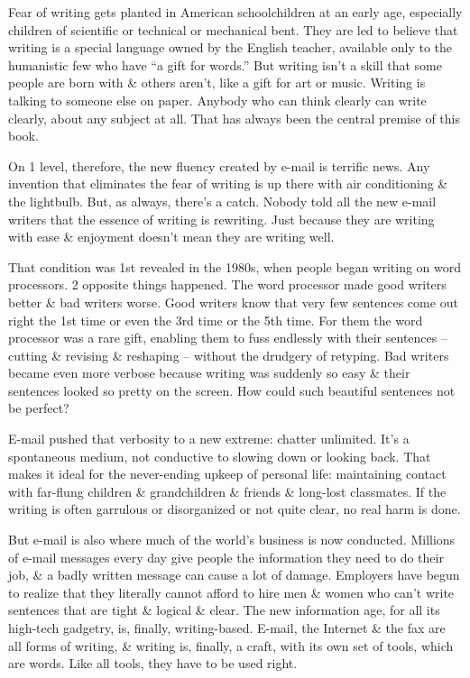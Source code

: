 \documentclass{article}
\begin{document}
Fear of writing gets planted in American schoolchildren at an early age, especially children of scientific or technical or mechanical bent. They are led to believe that writing is a special language owned by the English teacher, available only to the humanistic few who have ``a gift for words.'' But writing isn't a skill that some people are born with \& others aren't, like a gift for art or music. Writing is talking to someone else on paper. Anybody who can think clearly can write clearly, about any subject at all. That has always been the central premise of this book.

On 1 level, therefore, the new fluency created by e-mail is terrific news. Any invention that eliminates the fear of writing is up there with air conditioning \& the lightbulb. But, as always, there's a catch. Nobody told all the new e-mail writers that the essence of writing is rewriting. Just because they are writing with ease \& enjoyment doesn't mean they are writing well.

That condition was 1st revealed in the 1980s, when people began writing on word processors. 2 opposite things happened. The word processor made good writers better \& bad writers worse. Good writers know that very few sentences come out right the 1st time or even the 3rd time or the 5th time. For them the word processor was a rare gift, enabling them to fuss endlessly with their sentences -- cutting \& revising \& reshaping -- without the drudgery of retyping. Bad writers became even more verbose because writing was suddenly so easy \& their sentences looked so pretty on the screen. How could such beautiful sentences not be perfect?

E-mail pushed that verbosity to a new extreme: chatter unlimited. It's a spontaneous medium, not conductive to slowing down or looking back. That makes it ideal for the never-ending upkeep of personal life: maintaining contact with far-flung children \& grandchildren \& friends \& long-lost classmates. If the writing is often garrulous or disorganized or not quite clear, no real harm is done.

But e-mail is also where much of the world's business is now conducted. Millions of e-mail messages every day give people the information they need to do their job, \& a badly written message can cause a lot of damage. Employers have begun to realize that they literally cannot afford to hire men \& women who can't write sentences that are tight \& logical \& clear. The new information age, for all its high-tech gadgetry, is, finally, writing-based. E-mail, the Internet \& the fax are all forms of writing, \& writing is, finally, a craft, with its own set of tools, which are words. Like all tools, they have to be used right.
\end{document}
